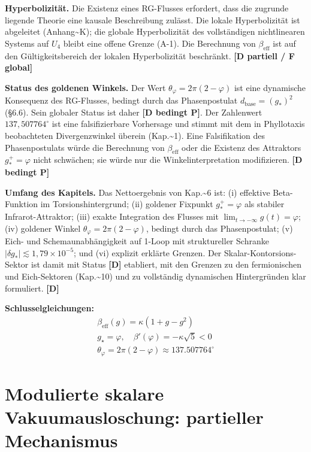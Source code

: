 ﻿\documentclass[11pt,letterpaper]{article}
\begin{document}
\textbf{Hyperbolizität.} Die Existenz eines RG-Flusses erfordert, dass die zugrunde liegende Theorie eine kausale Beschreibung zulässt. Die lokale Hyperbolizität ist abgeleitet (Anhang\textasciitilde{}K); die globale Hyperbolizität des vollständigen nichtlinearen Systems auf $U_4$ bleibt eine offene Grenze (A-1). Die Berechnung von $\beta_{\text{eff}}$ ist auf den Gültigkeitsbereich der lokalen Hyperbolizität beschränkt. \textbf{[D partiell / F global]}

\textbf{Status des goldenen Winkels.} Der Wert $\theta_\varphi = 2\pi(2 - \varphi)$ ist eine dynamische Konsequenz des RG-Flusses, bedingt durch das Phasenpostulat $d_{\text{base}} = (g_*)^2$ (§6.6). Sein globaler Status ist daher \textbf{[D bedingt P]}. Der Zahlenwert $137{,}507764^\circ$ ist eine falsifizierbare Vorhersage und stimmt mit dem in Phyllotaxis beobachteten Divergenzwinkel überein (Kap.\textasciitilde{}1). Eine Falsifikation des Phasenpostulats würde die Berechnung von $\beta_{\text{eff}}$ oder die Existenz des Attraktors $g_*^+ = \varphi$ nicht schwächen; sie würde nur die Winkelinterpretation modifizieren. \textbf{[D bedingt P]}

\textbf{Umfang des Kapitels.} Das Nettoergebnis von Kap.\textasciitilde{}6 ist: (i) effektive Beta-Funktion im Torsionshintergrund; (ii) goldener Fixpunkt $g_*^+ = \varphi$ als stabiler Infrarot-Attraktor; (iii) exakte Integration des Flusses mit $\lim_{t \to -\infty} g(t) = \varphi$; (iv) goldener Winkel $\theta_\varphi = 2\pi(2 - \varphi)$, bedingt durch das Phasenpostulat; (v) Eich- und Schemaunabhängigkeit auf 1-Loop mit struktureller Schranke $|\delta g_*| \lesssim 1{,}79 \times 10^{-5}$; und (vi) explizit erklärte Grenzen. Der Skalar-Kontorsions-Sektor ist damit mit Status \textbf{[D]} etabliert, mit den Grenzen zu den fermionischen und Eich-Sektoren (Kap.\textasciitilde{}10) und zu vollständig dynamischen Hintergründen klar formuliert. \textbf{[D]}

\textbf{Schlusselgleichungen:}
\begin{align*}
    \beta_{\mathrm{eff}}(g) = \kappa(1+g-g^2) \\
    g_\star = \varphi, \quad \beta'(\varphi) = -\kappa\sqrt{5} < 0 \\
    \theta_\varphi = 2\pi(2-\varphi) \approx 137.507764^\circ
\end{align*}
\section{Modulierte skalare Vakuumausloschung: partieller Mechanismus}
\end{document}
